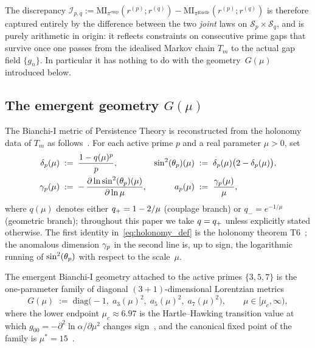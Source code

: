 \begin{remark}
\label{rmk:residual_arithmetic}
The discrepancy
$\mathcal{I}_{p,q}
:= \mathrm{MI}_{\pi^{\mathrm{emp}}}(r^{(p)}; r^{(q)})
 - \mathrm{MI}_{\pi^{\mathrm{Ruelle}}}(r^{(p)}; r^{(q)})$
is therefore captured entirely by the difference between the two
\emph{joint} laws on $\mathcal{S}_p \times \mathcal{S}_q$, and is
purely arithmetic in origin: it reflects constraints on consecutive
prime gaps that survive once one passes from the idealised Markov chain
$T_m$ to the actual gap field $\{g_n\}$. In particular it has nothing
to do with the geometry~$G(\mu)$ introduced
below.
\end{remark}

\subsection{The emergent geometry $G(\mu)$}
\label{ssec:emergent_geometry}

The Bianchi-I metric of Persistence Theory is reconstructed from the
holonomy data of $T_m$ as follows~\cite[Ch.~10--12]{PT_Monograph}. For
each active prime $p$ and a real parameter $\mu > 0$, set
\begin{align}
  \delta_p(\mu) &\;:=\; \frac{1 - q(\mu)^p}{p},
  &
  \sin^2(\theta_{p})(\mu) &\;:=\; \delta_p(\mu)\bigl(2 - \delta_p(\mu)\bigr),
  \label{eq:holonomy_def}
\\
  \gamma_{p}(\mu) &\;:=\;
   -\,\frac{\partial \ln \sin^2(\theta_{p})(\mu)}{\partial \ln \mu},
  &
  a_p(\mu) &\;:=\; \frac{\gamma_{p}(\mu)}{\mu},
  \label{eq:scale_factor_def}
\end{align}
where $q(\mu)$ denotes either $q_{+} = 1 - 2/\mu$ (couplage branch) or
$q_- = e^{-1/\mu}$ (geometric branch); throughout this paper we take
$q = q_{+}$ unless explicitly stated otherwise. The first identity
in~\eqref{eq:holonomy_def} is the holonomy theorem
T6~\cite[Ch.~6]{PT_Monograph}; the anomalous dimension $\gamma_{p}$ in
the second line is, up to sign, the logarithmic running of $\sin^2(\theta_{p})$
with respect to the scale~$\mu$.

\begin{definition}
\label{def:G_mu}
The emergent Bianchi-I geometry attached to the active primes
$\{3, 5, 7\}$ is the one-parameter family of diagonal
$(3+1)$-dimensional Lorentzian metrics
\begin{equation}
  G(\mu) \;:=\; \mathrm{diag}\bigl(-1,\; a_3(\mu)^2,\; a_5(\mu)^2,\; a_7(\mu)^2\bigr),
  \qquad \mu \in [\mu_c, \infty),
  \label{eq:G_def}
\end{equation}
where the lower endpoint $\mu_c \approx 6.97$ is the Hartle--Hawking
transition value at which $g_{00} = -\partial^2 \ln \alpha/\partial \mu^2$
changes sign~\cite[Ch.~12]{PT_Monograph}, and the canonical fixed point
of the family is $\mu^\ast = 15$~\cite[Thm.~T5]{PT_Monograph}.
\end{definition}

